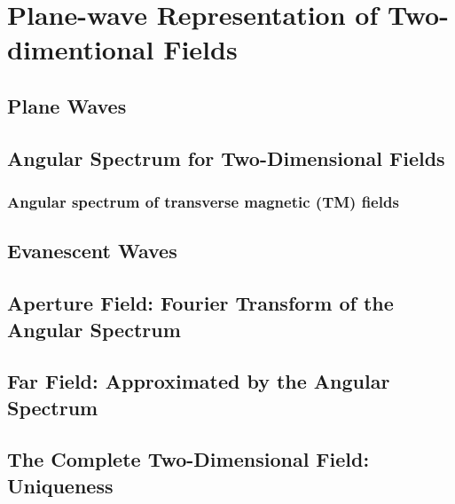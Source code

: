 \chapter{Plane-wave Representation of Two-dimentional Fields}
\label{ch:pw2d}
\section{Plane Waves}

\section{Angular Spectrum for Two-Dimensional Fields}
\subsection{Angular spectrum of transverse magnetic (TM) fields}

\section{Evanescent Waves}

\section{Aperture Field: Fourier Transform of the Angular Spectrum}

\section{Far Field: Approximated by the Angular Spectrum}

\section{The Complete Two-Dimensional Field: Uniqueness}

